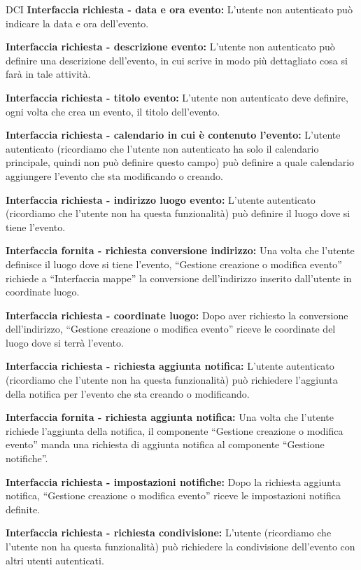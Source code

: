 \begin{listaPersonale}{DCI}
    \textbf{Interfaccia richiesta - data e ora evento:} L'utente non autenticato può indicare la data e ora dell'evento.

    \textbf{Interfaccia richiesta - descrizione evento:} L'utente non autenticato può definire una descrizione dell'evento, in cui scrive in modo più dettagliato cosa si farà in tale attività.

    \textbf{Interfaccia richiesta - titolo evento:} L'utente non autenticato deve definire, ogni volta che crea un evento, il titolo dell'evento.

    \textbf{Interfaccia richiesta - calendario in cui è contenuto l'evento:} L'utente autenticato (ricordiamo che l'utente non autenticato ha solo il calendario principale, quindi non può definire questo campo) può definire a quale calendario aggiungere l'evento che sta modificando o creando.

    \textbf{Interfaccia richiesta - indirizzo luogo evento:} L'utente autenticato (ricordiamo che l'utente non ha questa funzionalità) può definire il luogo dove si tiene l'evento.

    \textbf{Interfaccia fornita - richiesta conversione indirizzo:} Una volta che l'utente definisce il luogo dove si tiene l'evento, “Gestione creazione o modifica evento” richiede a “Interfaccia mappe” la conversione dell'indirizzo inserito dall'utente in coordinate luogo.

    \textbf{Interfaccia richiesta - coordinate luogo:} Dopo aver richiesto la conversione dell'indirizzo, “Gestione creazione o modifica evento” riceve le coordinate del luogo dove si terrà l'evento.

    \textbf{Interfaccia richiesta - richiesta aggiunta notifica:} L'utente autenticato (ricordiamo che l'utente non ha questa funzionalità)  può richiedere l'aggiunta della notifica per l'evento che sta creando o modificando.

    \textbf{Interfaccia fornita - richiesta aggiunta notifica:} Una volta che l'utente richiede l'aggiunta della notifica, il componente “Gestione creazione o modifica evento” manda una richiesta di aggiunta notifica al componente “Gestione notifiche”.

    \textbf{Interfaccia richiesta - impostazioni notifiche:} Dopo la richiesta aggiunta notifica, “Gestione creazione o modifica evento” riceve le impostazioni notifica definite.

    \textbf{Interfaccia richiesta - richiesta condivisione:} L'utente (ricordiamo che l'utente non ha questa funzionalità) può richiedere la condivisione dell'evento con altri utenti autenticati.


\end{listaPersonale}
